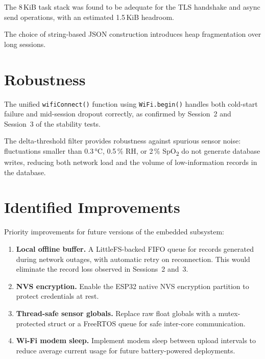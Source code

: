 The 8\,KiB task stack was found to be adequate for the TLS handshake and async send
operations, with an estimated 1.5\,KiB headroom.

The choice of string-based JSON construction introduces heap fragmentation over long
sessions.

\section{Robustness}

The unified \texttt{wifiConnect()} function using \texttt{WiFi.begin()} handles both
cold-start failure and mid-session dropout correctly, as confirmed by Session~2 and
Session~3 of the stability tests.

The delta-threshold filter provides robustness against spurious sensor noise:
fluctuations smaller than 0.3\,°C, 0.5\,\% RH, or 2\,\% SpO\textsubscript{2} do
not generate database writes, reducing both network load and the volume of
low-information records in the database.

\section{Identified Improvements}

Priority improvements for future versions of the embedded subsystem:

\begin{enumerate}
	\item \textbf{Local offline buffer.}
	      A LittleFS-backed FIFO queue for records generated during network outages,
	      with automatic retry on reconnection.
	      This would eliminate the record loss observed in Sessions~2 and~3.

	\item \textbf{NVS encryption.}
	      Enable the ESP32 native NVS encryption partition to protect credentials at rest.

	\item \textbf{Thread-safe sensor globals.}
	      Replace raw float globals with a mutex-protected struct or a FreeRTOS queue
	      for safe inter-core communication.

	\item \textbf{Wi-Fi modem sleep.}
	      Implement modem sleep between upload intervals to reduce average current usage for future battery-powered deployments.
\end{enumerate}

